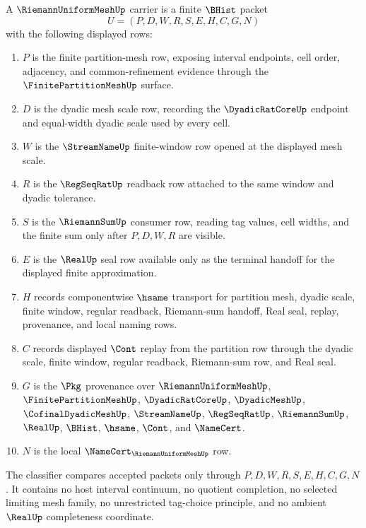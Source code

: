 \begin{definition}
\label{def:riemann-uniform-mesh-namecert}
A $\RiemannUniformMeshUp$ carrier is a finite $\BHist$ packet
$$
U=(P,D,W,R,S,E,H,C,G,N)
$$
with the following displayed rows:
\begin{enumerate}
\item $P$ is the finite partition-mesh row, exposing interval endpoints, cell order, adjacency, and common-refinement evidence through the $\FinitePartitionMeshUp$ surface.
\item $D$ is the dyadic mesh scale row, recording the $\DyadicRatCoreUp$ endpoint and equal-width dyadic scale used by every cell.
\item $W$ is the $\StreamNameUp$ finite-window row opened at the displayed mesh scale.
\item $R$ is the $\RegSeqRatUp$ readback row attached to the same window and dyadic tolerance.
\item $S$ is the $\RiemannSumUp$ consumer row, reading tag values, cell widths, and the finite sum only after $P,D,W,R$ are visible.
\item $E$ is the $\RealUp$ seal row available only as the terminal handoff for the displayed finite approximation.
\item $H$ records componentwise $\hsame$ transport for partition mesh, dyadic scale, finite window, regular readback, Riemann-sum handoff, Real seal, replay, provenance, and local naming rows.
\item $C$ records displayed $\Cont$ replay from the partition row through the dyadic scale, finite window, regular readback, Riemann-sum row, and Real seal.
\item $G$ is the $\Pkg$ provenance over $\RiemannUniformMeshUp$, $\FinitePartitionMeshUp$, $\DyadicRatCoreUp$, $\DyadicMeshUp$, $\CofinalDyadicMeshUp$, $\StreamNameUp$, $\RegSeqRatUp$, $\RiemannSumUp$, $\RealUp$, $\BHist$, $\hsame$, $\Cont$, and $\NameCert$.
\item $N$ is the local $\NameCert_{\RiemannUniformMeshUp}$ row.
\end{enumerate}
The classifier compares accepted packets only through $P,D,W,R,S,E,H,C,G,N$. It contains no host interval continuum, no quotient completion, no selected limiting mesh family, no unrestricted tag-choice principle, and no ambient $\RealUp$ completeness coordinate.
\end{definition}

